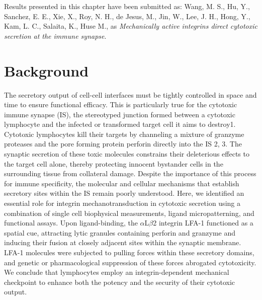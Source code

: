 Results presented in this chapter have been submitted as: Wang,  M. S.,  Hu,  Y., Sanchez,  E. E.,  Xie,  X.,  Roy,  N. H.,  de Jesus,  M.,  Jin,  W.,  Lee,  J. H.,  Hong,  Y., Kam,  L. C.,  Salaita,  K.,  Huse M.,  as \textit{Mechanically active integrins direct cytotoxic secretion at the immune synapse}. 

\section{Background}
The secretory output of cell-cell interfaces must be tightly controlled in space and time to ensure functional efficacy. This is particularly true for the cytotoxic immune synapse (IS), the stereotyped junction formed between a cytotoxic lymphocyte and the infected or transformed target cell it aims to destroy1. Cytotoxic lymphocytes kill their targets by channeling a mixture of granzyme proteases and the pore forming protein perforin directly into the IS 2, 3. The synaptic secretion of these toxic molecules constrains their deleterious effects to the target cell alone, thereby protecting innocent bystander cells in the surrounding tissue from collateral damage. Despite the importance of this process for immune specificity, the molecular and cellular mechanisms that establish secretory sites within the IS remain poorly understood. Here, we identified an essential role for integrin mechanotransduction in cytotoxic secretion using a combination of single cell biophysical measurements, ligand micropatterning, and functional assays. Upon ligand-binding, the $\alpha$L$\beta$2 integrin LFA-1 functioned as a spatial cue, attracting lytic granules containing perforin and granzyme and inducing their fusion at closely adjacent sites within the synaptic membrane. LFA-1 molecules were subjected to pulling forces within these secretory domains, and genetic or pharmacological suppression of these forces abrogated cytotoxicity. We conclude that lymphocytes employ an integrin-dependent mechanical checkpoint to enhance both the potency and the security of their cytotoxic output.

